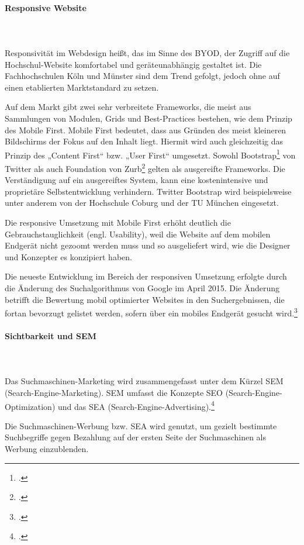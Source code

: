 \paragraph{Responsive Website}\mbox{}\\\\
Responsivität im Webdesign heißt, das im Sinne des BYOD, der Zugriff auf die Hochschul-Website komfortabel und geräteunabhängig gestaltet ist. Die Fachhochschulen Köln und Münster sind dem Trend gefolgt, jedoch ohne auf einen etablierten Marktstandard zu setzen.

Auf dem Markt gibt zwei sehr verbreitete Frameworks, die meist aus Sammlungen von Modulen, Grids und Best-Practices bestehen, wie dem Prinzip des Mobile First. Mobile First bedeutet, dass aus Gründen des meist kleineren Bildschirms der Fokus auf den Inhalt liegt. Hiermit wird auch gleichzeitig das Prinzip des „Content First“ bzw. „User First“ umgesetzt. Sowohl Bootstrap\footcite{bootstrap_home_2015} von Twitter als auch Foundation von Zurb\footcite{foundation_home_2015} gelten als ausgereifte Frameworks. Die Verständigung auf ein ausgereiftes System, kann eine kostenintensive und proprietäre Selbstentwicklung verhindern. Twitter Bootstrap wird beispielsweise unter anderem von der Hochschule Coburg und der TU München eingesetzt.

Die responsive Umsetzung mit Mobile First erhöht deutlich die Gebrauchstauglichkeit (engl. Usability), weil die Website auf dem mobilen Endgerät nicht gezoomt werden muss und so ausgeliefert wird, wie die Designer und Konzepter es konzipiert haben.

Die neueste Entwicklung im Bereich der responsiven Umsetzung erfolgte durch die Änderung des Suchalgorithmus von Google im April 2015. Die Änderung betrifft die Bewertung mobil optimierter Websites in den Suchergebnissen, die fortan bevorzugt gelistet werden, sofern über ein mobiles Endgerät gesucht wird.\footcite{heise_google_mobile_2015}


\paragraph{Sichtbarkeit und SEM}\mbox{}\\\\ 
Das Suchmaschinen-Marketing wird zusammengefasst unter dem Kürzel SEM (Search-Engine-Marketing). SEM umfasst die Konzepte SEO (Search-Engine-Optimization) und das SEA (Search-Engine-Advertising).\footcite[Vgl.][83]{kr_ru_wiba_2015}

Die Suchmaschinen-Werbung bzw. SEA wird genutzt, um gezielt bestimmte Suchbegriffe gegen Bezahlung auf der ersten Seite der Suchmaschinen als Werbung einzublenden.

